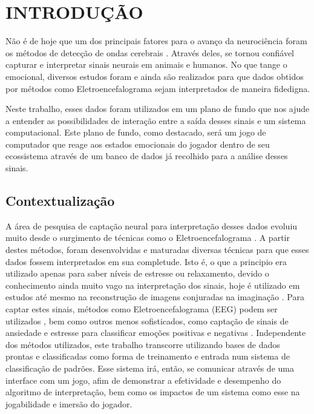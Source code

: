\chapter{INTRODUÇÃO}
\label{intro}

Não é de hoje que um dos principais fatores para o avanço da neurociência foram os métodos de detecção de ondas cerebrais \cite{eegimportanciasite}. Através deles, se tornou confiável capturar e interpretar sinais neurais em animais e humanos. No que tange o emocional, diversos estudos foram e ainda são realizados para que dados obtidos por métodos como Eletroencefalograma sejam interpretados de maneira fidedigna.

Neste trabalho, esses dados foram utilizados em um plano de fundo que nos ajude a entender as possibilidades de interação entre a saída desses sinais e um sistema computacional. Este plano de fundo, como destacado, será um jogo de computador que reage aos estados emocionais do jogador dentro de seu ecossistema através de um banco de dados já recolhido para a análise desses sinais.

\section{Contextualização}

A área de pesquisa de captação neural para interpretação desses dados evoluiu muito desde o surgimento de técnicas como o Eletroencefalograma \cite{rocha2022analise}. A partir destes métodos, foram desenvolvidas e maturadas diversas técnicas para que esses dados fossem interpretados em sua completude. Isto é, o que a principio era utilizado apenas para saber níveis de estresse ou relaxamento, devido o conhecimento ainda muito vago na interpretação dos sinais, hoje é utilizado em estudos até mesmo na reconstrução de imagens conjuradas na imaginação \cite{shimizu2022improving}. Para captar estes sinais, métodos como Eletroencefalograma (EEG) podem ser utilizados \cite{moises2020reconhecimento}, bem como outros menos sofisticados, como captação de sinais de ansiedade e estresse para classificar emoções positivas e negativas \cite{nalepa2019emotionalcontext}. Independente dos métodos utilizados, este trabalho transcorre utilizando bases de dados prontas e classificadas como forma de treinamento e entrada num sistema de classificação de padrões. Esse sistema irá, então, se comunicar através de uma interface com um jogo, afim de demonstrar a efetividade e desempenho do algoritmo de interpretação, bem como os impactos de um sistema como esse na jogabilidade e imersão do jogador.

